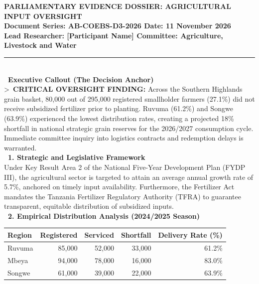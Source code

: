 \documentclass[11pt, a4paper]{report}
\begin{document}
\begin{tcolorbox}[colback=lightgrey, colframe=bordergrey, title=\textbf{Deliverable 3 Preview: \texttt{Day3\_Sector\_Evidence\_Dossier.md}}]
\small
\textcolor{tanzaniablue}{\textbf{PARLIAMENTARY EVIDENCE DOSSIER: AGRICULTURAL INPUT OVERSIGHT}}\\
\textbf{\textcolor{tanzaniablue}{Document Series:} AB-COEBS-D3-2026 \quad \textbar{} \quad \textcolor{suagreen}{\textbf{Date:}} 11 November 2026}\\
\textbf{\textcolor{tanzaniablue}{Lead Researcher:} [Participant Name] \quad \textbar{} \quad \textcolor{tanzaniablue}{\textbf{Committee:}} Agriculture, Livestock and Water}\\[0.2cm]
\rule{\textwidth}{0.4pt}\\[0.2cm]
\textcolor{tanzaniablue}{\textbf{\ Executive Callout (The Decision Anchor)}}\\
\textgreater\ \textbf{CRITICAL OVERSIGHT FINDING:} Across the Southern Highlands grain basket, 80,000 out of 295,000 registered smallholder farmers (27.1\%) did not receive subsidized fertilizer prior to planting. Ruvuma (61.2\%) and Songwe (63.9\%) experienced the lowest distribution rates, creating a projected 18\% shortfall in national strategic grain reserves for the 2026/2027 consumption cycle. Immediate committee inquiry into logistics contracts and redemption delays is warranted.\\[0.2cm]
\textcolor{tanzaniablue}{\textbf{\ 1. Strategic and Legislative Framework}}\\
Under Key Result Area 2 of the National Five-Year Development Plan (FYDP III), the agricultural sector is targeted to attain an average annual growth rate of 5.7\%, anchored on timely input availability. Furthermore, the Fertilizer Act mandates the Tanzania Fertilizer Regulatory Authority (TFRA) to guarantee transparent, equitable distribution of subsidized inputs.\\[0.2cm]
\textcolor{tanzaniablue}{\textbf{\ 2. Empirical Distribution Analysis (2024/2025 Season)}}\\
\begin{tabular}{lrrrr}
\toprule
\textbf{Region} & \textbf{Registered} & \textbf{Serviced} & \textbf{Shortfall} & \textbf{Delivery Rate (\%)} \\
\midrule
Ruvuma & 85,000 & 52,000 & 33,000 & 61.2\% \\
Mbeya & 94,000 & 78,000 & 16,000 & 83.0\% \\
Songwe & 61,000 & 39,000 & 22,000 & 63.9\% \\

\end{tabular}
\end{tcolorbox}
\end{document}
